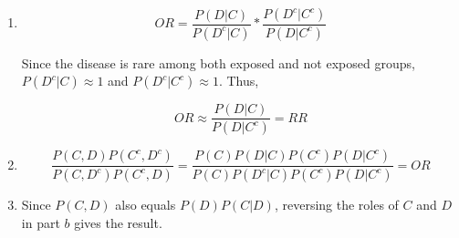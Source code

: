 \begin{enumerate}[label=(\alph*)]
\item $$OR = \frac{P(D|C)}{P(D^{c}|C)} * \frac{P(D^{c}|C^{c})}{P
(D|C^{c})}$$

Since the disease is rare among both exposed and not exposed groups, $P(D^{c}|C)
\approx 1$ and $P(D^{c}|C^{c}) \approx 1$. Thus,

$$OR \approx \frac{P(D|C)}{P(D|C^{c})} = RR$$

\item 
$$\frac{P(C,D)P(C^{c}, D^{c})}{P(C, D^{c}){P(C^{c}, D)}} = \frac{P(C)P(D|C)P
(C^{c})P(D|C^{c})}{P(C)P(D^{c}|C)P(C^{c})P(D|C^{c})} = OR$$

\item Since $P(C, D)$ also equals $P(D)P(C|D)$, reversing the roles of $C$ and
$D$ in part $b$ gives the result.

\end{enumerate}